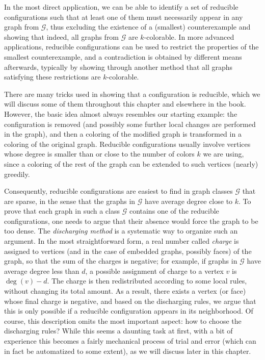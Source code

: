 \documentclass[12pt,twoside,openright,a4paper]{book}
\newcommand{\GG}{\mathcal{G}}
\begin{document}
In the most direct application, we can be able to identify a set of reducible configurations such that
at least one of them must necessarily appear in any graph from $\GG$, thus excluding the existence of
a (smallest) counterexample and showing that indeed, all graphs from $\GG$ are $k$-colorable.
In more advanced applications, reducible configurations can be used to restrict the properties
of the smallest counterexample, and a contradiction is obtained by different means afterwards, typically
by showing through another method that all graphs satisfying these restrictions are $k$-colorable.

There are many tricks used in showing that a configuration is reducible, which we will discuss some
of them throughout this chapter and elsewhere in the book. However, the basic idea almost always resembles
our starting example: the configuration is removed (and possibly some further local changes are
performed in the graph), and then a coloring of the modified graph is transformed in a coloring of the
original graph.  Reducible configurations usually involve vertices whose degree is
smaller than or close to the number of colors $k$ we are using, since a coloring of the rest of the graph
can be extended to such vertices (nearly) greedily.

Consequently, reducible configurations are easiest to find in graph classes $\GG$ that are sparse, in the
sense that the graphs in $\GG$ have average degree close to $k$. To prove that each graph in such a class $\GG$
contains one of the reducible configurations, one needs to argue that their absence would force the graph to be
too dense.  The \emph{discharging method} is a systematic way to organize such an argument.  In the most straightforward
form, a real number called \emph{charge} is assigned to vertices (and in the case of embedded graphs, possibly faces)
of the graph, so that the sum of the charges is negative; for example, if graphs in $\GG$ have average degree less than $d$,
a possible assignment of charge to a vertex $v$ is $\deg(v)-d$.  The charge is then redistributed according to some local
rules, without changing its total amount.  As a result, there exists a vertex (or face) whose final charge is negative,
and based on the discharging rules, we argue that this is only possible if a reducible configuration appears in its neighborhood.
Of course, this description omits the most important aspect: how to choose the discharging rules?
While this seems a daunting task at first, with a bit of experience this becomes a fairly mechanical process of trial and error
(which can in fact be automatized to some extent), as we will discuss later in this chapter.
\end{document}
